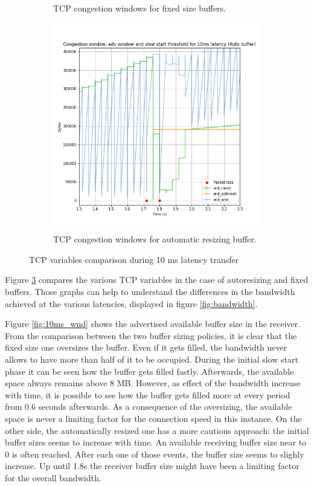 \documentclass[a4paper,10pt]{article}
\begin{document}
\begin{figure}[]
\begin{subfigure}{0.5\textwidth}
   \caption{TCP congestion windows for fixed size buffers.}
    \label{fig:10ms_fixed}
\end{subfigure}
\qquad
\begin{subfigure}{0.5\textwidth}
   \centering
   \includegraphics[width=\textwidth]{images/10_detail_windows_auto.png}
    \caption{TCP congestion windows for automatic resizing buffer.}
    \label{fig:10ms_auto}
\end{subfigure}

\caption[short]{TCP variables comparison during 10 ms latency transfer}
\label{fig:tcp_variables}
\end{figure}

Figure \ref{fig:tcp_variables} compares the various TCP variables in the case of autoresizing and fixed buffers. Those graphs can help to understand the differences in the bandwidth achieved at the various latencies, displayed in figure \ref{fig:bandwidth}. 

Figure \ref{fig:10ms_wnd} shows the advertised available buffer size in the receiver. From the comparison between the two buffer sizing policies, it is clear that the fixed size one oversizes the buffer. Even if it gets filled, the bandwidth never allows to have more than half of it to be occupied. During the initial slow start phase it can be seen how the buffer gets filled fastly. Afterwards, the available space always remains above 8 MB. However, as effect of the bandwidth increase with time, it is possible to see how the buffer gets filled more at every period from 0.6 seconds afterwards. As a consequence of the oversizing, the available space is never a limiting factor for the connection speed in this instance. 
On the other side, the automatically resized one has a more cautious approach: the initial buffer sizes seems to increase with time. An available receiving buffer size near to 0 is often reached. After each one of those events, the buffer size seems to slighly increase. Up until 1.8s the receiver buffer size might have been a limiting factor for the overall bandwidth. 
\end{document}
